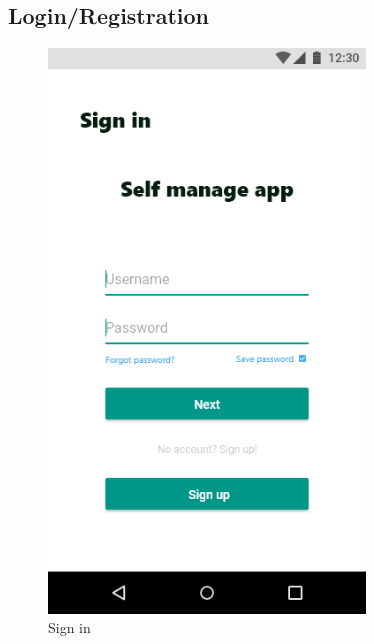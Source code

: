 \documentclass[a4paper,11pt]{article} %
\begin{document}
\subsection{Login/Registration}
\begin{figure}[h!]
  \centering
  \includegraphics[width=0.75\textwidth]{img/ui-wireframe/Sign-in.png}
  \caption{Sign in}
\end{figure}
\newpage
\end{document}
